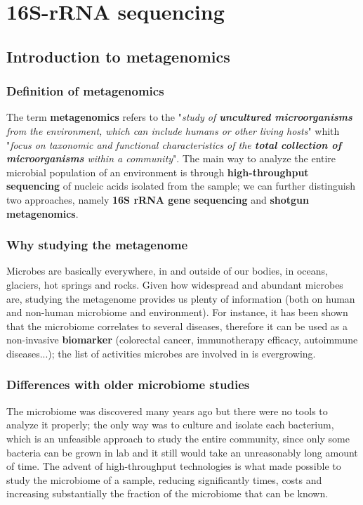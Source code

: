 \graphicspath{{chapters/images/07}}
\chapter{16S-rRNA sequencing}

\section{Introduction to metagenomics}

  \subsection{Definition of metagenomics}
    The term \textbf{metagenomics} refers to the "\textit{study of \textbf{uncultured microorganisms} from the environment, which can include humans or other living hosts}" whith "\textit{focus on taxonomic and functional characteristics of the \textbf{total collection of microorganisms} within a community}". The main way to analyze the entire microbial population of an environment is through \textbf{high-throughput sequencing} of nucleic acids isolated from the sample; we can further distinguish two approaches, namely \textbf{16S rRNA gene sequencing} and \textbf{shotgun  metagenomics}.

  \subsection{Why studying the metagenome}
    Microbes are basically everywhere, in and outside of our bodies, in oceans, glaciers, hot springs and rocks. Given how widespread and abundant microbes are, studying the metagenome provides us plenty of information (both on human and non-human microbiome and environment). For instance, it has been shown that the microbiome correlates to several diseases, therefore it can be used as a non-invasive \textbf{biomarker} (colorectal cancer, immunotherapy efficacy, autoimmune diseases...); the list of activities microbes are involved in is evergrowing.

  \subsection{Differences with older microbiome studies}
    The microbiome was discovered many years ago but there were no tools to analyze it properly; the only way was to culture and isolate each bacterium, which is an unfeasible approach to study the entire community, since only some bacteria can be grown in lab and it still would take an unreasonably long amount of time. The advent of high-throughput technologies is what made possible to study the microbiome of a sample, reducing significantly times, costs and increasing substantially the fraction of the microbiome that can be known.

